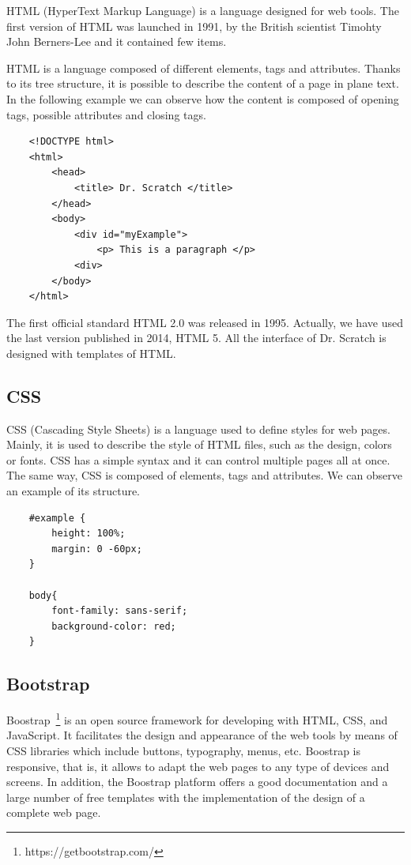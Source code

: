 HTML (HyperText Markup Language) is a language designed for web tools. The first version of HTML was launched in 1991, by the British scientist Timohty John Berners-Lee and it contained few items. 

HTML is a language composed of different elements, tags and attributes. Thanks to its tree structure, it is possible to describe the content of a page in plane text. In the following example we can observe how the content is composed of opening tags, possible attributes and closing tags. 

{\footnotesize
\begin{verbatim}
    <!DOCTYPE html>
    <html>
        <head>
            <title> Dr. Scratch </title>
        </head>
        <body>
            <div id="myExample">
                <p> This is a paragraph </p>
            <div>
        </body>
    </html>        
\end{verbatim}
}

The first official standard HTML 2.0 was released in 1995. Actually, we have used the last version published in 2014, HTML 5. All the interface of Dr. Scratch is designed with templates of HTML.


\subsection{CSS}
\label{subsec:css}

CSS (Cascading Style Sheets) is a language used to define styles for web pages. Mainly, it is used to describe the style of HTML files, such as the design, colors or fonts. CSS has a simple syntax and it can control multiple pages all at once. The same way, CSS is composed of elements, tags and attributes. We can observe an example of its structure.  

{\footnotesize
\begin{verbatim}
    #example {
        height: 100%;
        margin: 0 -60px;
    } 
    
    body{
        font-family: sans-serif;
        background-color: red;
    }
\end{verbatim}
}

\subsection{Bootstrap}
\label{subsec:bootstrap}

Boostrap~\footnote{https://getbootstrap.com/} is an open source framework for developing with HTML, CSS, and JavaScript. It facilitates the design and appearance of the web tools by means of CSS libraries which include buttons, typography, menus, etc. Boostrap is responsive, that is, it allows to adapt the web pages to any type of devices and screens.
In addition, the Boostrap platform offers a good documentation and a large number of free templates with the implementation of the design of a complete web page. 


